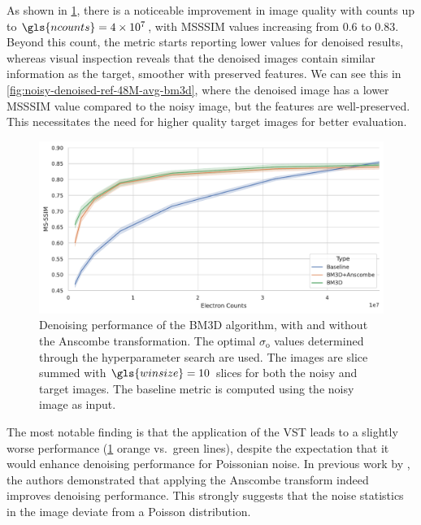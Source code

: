 As shown in \cref{fig:bm3d-msssim}, there is a noticeable improvement in image quality with counts up to $\gls{ncounts}=\num{4e7}$, with \gls{MSSSIM} values increasing from \num{0.6} to \num{0.83}. Beyond this count, the metric starts reporting lower values for denoised results, whereas visual inspection reveals that the denoised images contain similar information as the target, smoother with preserved features. We can see this in \cref{fig:noisy-denoised-ref-48M-avg-bm3d}, where the denoised image has a lower \gls{MSSSIM} value compared to the noisy image, but the features are well-preserved. This necessitates the need for higher quality target images for better evaluation.

\begin{figure}
    \centering
    \includegraphics[width=1\linewidth]{images/bm3d_msssim.pdf}
    \caption{Denoising performance of the \gls{BM3D} algorithm, with and without the Anscombe transformation. The optimal $\sigma_{\text{o}}$ values determined through the hyperparameter search are used. The images are slice summed with $\gls{winsize}=10$ slices for both the noisy and target images. The baseline metric is computed using the noisy image as input.}
    \label{fig:bm3d-msssim}
\end{figure}


The most notable finding is that the application of the \gls{VST} leads to a slightly worse performance (\cref{fig:bm3d-msssim} orange vs.\ green lines), despite the expectation that it would enhance denoising performance for Poissonian noise. In previous work by \citeauthor{makitaloOptimalInversionAnscombe2011}, the authors demonstrated that applying the Anscombe transform indeed improves denoising performance. This strongly suggests that the noise statistics in the image deviate from a Poisson distribution. 

